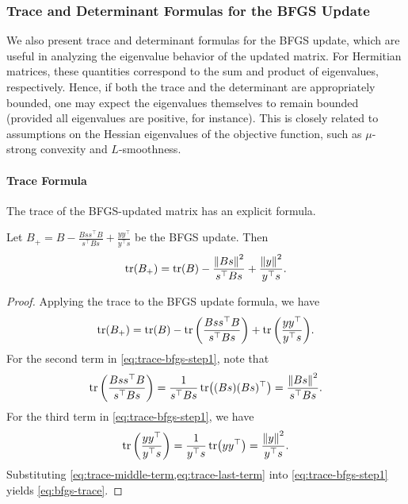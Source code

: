 \documentclass[0_en]{subfiles}
\begin{document}
\subsubsection{Trace and Determinant Formulas for the BFGS Update}

We also present trace and determinant formulas for the BFGS update, which are useful in analyzing the eigenvalue behavior of the updated matrix.
For Hermitian matrices, these quantities correspond to the sum and product of eigenvalues, respectively. Hence, if both the trace and the determinant are appropriately bounded, one may expect the eigenvalues themselves to remain bounded (provided all eigenvalues are positive, for instance).
This is closely related to assumptions on the Hessian eigenvalues of the objective function, such as $\mu$-strong convexity and $L$-smoothness.

\paragraph{Trace Formula}

The trace of the BFGS-updated matrix has an explicit formula.

\begin{proposition}\label{prop:bfgs-trace}
    Let $B_{+} = B - \frac{Bss^\top B}{s^\top Bs} + \frac{yy^\top}{y^\top s}$ be the BFGS update. Then
    \begin{equation}\label{eq:bfgs-trace}
        \tr(B_{+}) = \tr(B) - \frac{\norm{B s}^2}{s^\top Bs} + \frac{\norm{y}^2}{y^\top s}.
    \end{equation}
\end{proposition}

\begin{proof}
    Applying the trace to the BFGS update formula, we have
    \begin{equation}\label{eq:trace-bfgs-step1}
        \tr(B_{+}) = \tr(B) - \tr\qty(\frac{Bss^\top B}{s^\top Bs}) + \tr\qty(\frac{yy^\top}{y^\top s}).
    \end{equation}
    For the second term in \cref{eq:trace-bfgs-step1}, note that
    \begin{equation}\label{eq:trace-middle-term}
        \tr\qty(\frac{Bss^\top B}{s^\top Bs}) = \frac{1}{s^\top Bs}\tr((Bs)(Bs)^\top) = \frac{\norm{B s}^2}{s^\top Bs}.
    \end{equation}
    For the third term in \cref{eq:trace-bfgs-step1}, we have
    \begin{equation}\label{eq:trace-last-term}
        \tr\qty(\frac{yy^\top}{y^\top s}) = \frac{1}{y^\top s}\tr(yy^\top) = \frac{\norm{y}^2}{y^\top s}.
    \end{equation}
    Substituting \cref{eq:trace-middle-term,eq:trace-last-term} into \cref{eq:trace-bfgs-step1} yields \cref{eq:bfgs-trace}.
\end{proof}
\end{document}
